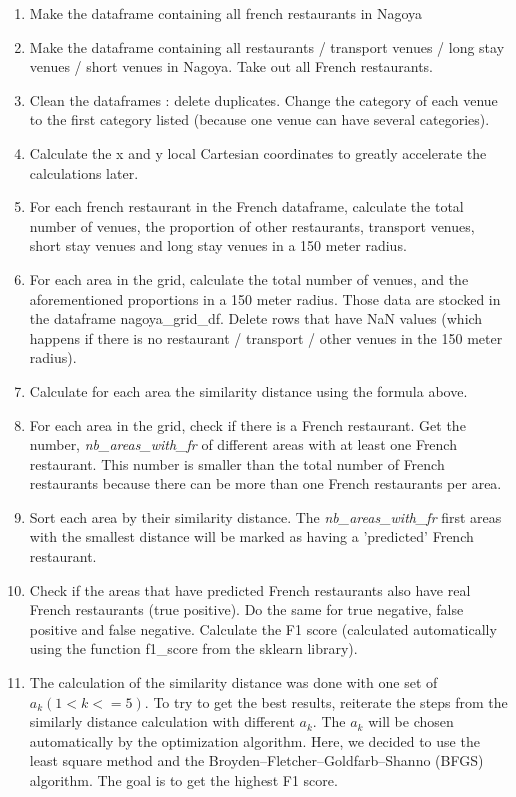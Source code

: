 \documentclass[12pt,a4paper]{article}
\begin{document}
\begin{enumerate}

	\item Make the dataframe containing all french restaurants in Nagoya

	\item Make the dataframe containing all restaurants / transport venues / long stay venues / short venues in Nagoya. Take out all French restaurants.
	
	\item Clean the dataframes : delete duplicates. Change the category of each venue to the first category listed (because one venue can have several categories).
	
	\item Calculate the x and y local Cartesian coordinates to greatly accelerate the calculations later.
	
	\item For each french restaurant in the French dataframe, calculate the total number of venues, the proportion of other restaurants, transport venues, short stay venues and long stay venues in a 150 meter radius.
	
	\item For each area in the grid, calculate the total number of venues, and the aforementioned proportions in a 150 meter radius. Those data are stocked in the dataframe nagoya\_grid\_df. Delete rows that have NaN values (which happens if there is no restaurant / transport / other venues in the 150 meter radius).
	
	\item Calculate for each area the similarity distance using the formula above.
	
	\item For each area in the grid, check if there is a French restaurant. Get the number, \textit{nb\_areas\_with\_fr} of different areas with at least one French restaurant. This number is smaller than the total number of French restaurants because there can be more than one French restaurants per area.
	
	\item Sort each area by their similarity distance. The \textit{nb\_areas\_with\_fr} first areas with the smallest distance will be marked as having a 'predicted' French restaurant.

	\item Check if the areas that have predicted French restaurants also have real French restaurants (true positive). Do the same for true negative, false positive and false negative. Calculate the F1 score (calculated automatically using the function f1\_score from the sklearn library).
	
	\item  The calculation of the similarity distance was done with one set of $a_k (1<k<=5)$. To try to get the best results, reiterate the steps from the similarly distance calculation with different $a_k$. The $a_k$ will be chosen automatically by the optimization algorithm. Here, we decided to use the least square method and the Broyden–Fletcher–Goldfarb–Shanno (BFGS) algorithm. The goal is to get the highest F1 score.

\end{enumerate}
\end{document}
